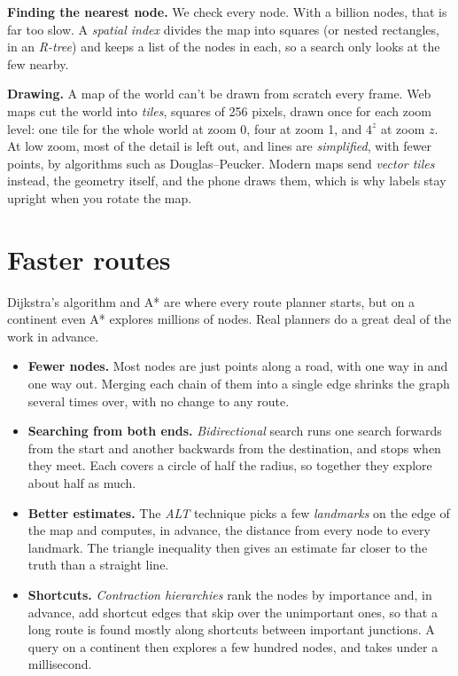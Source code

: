 \textbf{Finding the nearest node.} We check every node. With a billion
nodes, that is far too slow. A \emph{spatial index} divides the map into
squares (or nested rectangles, in an \emph{R-tree}) and keeps a list of
the nodes in each, so a search only looks at the few nearby.

\textbf{Drawing.} A map of the world can't be drawn from scratch every
frame. Web maps cut the world into \emph{tiles}, squares of 256 pixels,
drawn once for each zoom level: one tile for the whole world at zoom 0,
four at zoom 1, and $4^z$ at zoom $z$. At low zoom, most of the detail is
left out, and lines are \emph{simplified}, with fewer points, by
algorithms such as Douglas--Peucker. Modern maps send \emph{vector tiles}
instead, the geometry itself, and the phone draws them, which is why
labels stay upright when you rotate the map.

\section{Faster routes}

Dijkstra's algorithm and A* are where every route planner starts, but on a
continent even A* explores millions of nodes. Real planners do a great deal
of the work in advance.

\begin{itemize}
  \item \textbf{Fewer nodes.} Most nodes are just points along a road,
    with one way in and one way out. Merging each chain of them into a
    single edge shrinks the graph several times over, with no change to
    any route.
  \item \textbf{Searching from both ends.} \emph{Bidirectional} search
    runs one search forwards from the start and another backwards from the
    destination, and stops when they meet. Each covers a circle of half
    the radius, so together they explore about half as much.
  \item \textbf{Better estimates.} The \emph{ALT} technique picks a few
    \emph{landmarks} on the edge of the map and computes, in advance, the
    distance from every node to every landmark. The triangle inequality
    then gives an estimate far closer to the truth than a straight line.
  \item \textbf{Shortcuts.} \emph{Contraction hierarchies} rank the
    nodes by importance and, in advance, add shortcut edges that skip
    over the unimportant ones, so that a long route is found mostly along
    shortcuts between important junctions. A query on a continent then
    explores a few hundred nodes, and takes under a millisecond.
\end{itemize}

